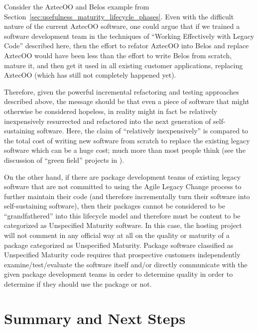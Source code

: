 \documentclass[11pt]{SANDreport}
\begin{document}
Consider the AztecOO and Belos example from
Section~\ref{sec:usefulness_maturity_lifecycle_phases}.  Even with the
difficult nature of the current AztecOO software, one could argue that
if we trained a software development team in the techniques of
``Working Effectively with Legacy Code'' described here, then the
effort to refator AztecOO into Belos and replace AztecOO would have
been less than the effort to write Belos from scratch, mature it, and
then get it used in all existing customer applications, replacing
AztecOO (which has still not completely happened yet).

Therefore, given the powerful incremental refactoring and testing
approaches described above, the message should be that even a piece of
software that might otherwise be considered hopeless, in reality might
in fact be relatively inexpensively resurrected and refactored into
the next generation of self-sustaining software.  Here, the claim of
``relatively inexpensively'' is compared to the total cost of writing
new software from scratch to replace the existing legacy software
which can be a huge cost; much more than most people think (see the
discussion of ``green field'' projects in
{}\cite{WorkingEffectivelyWithLegacyCode05}).

On the other hand, if there are package development teams of existing
legacy software that are not committed to using the Agile Legacy
Change process to further maintain their code (and therefore
incrementally turn their software into self-sustaining software), then
their packages cannot be considered to be ``grandfathered'' into this
lifecycle model and therefore must be content to be categorized as
Unspecified Maturity software.  In this case, the hosting project will
not comment in any official way at all on the quality or maturity of a
package categorized as Unspecified Maturity.  Package software
classified as Unspecified Maturity code requires that prospective
customers independently examine/test/evaluate the software itself
and/or directly communicate with the given package development teams
in order to determine quality in order to determine if they should use
the package or not.


%
{}\section{Summary and Next Steps}
\label{sec:summary_next_steps}
%
\end{document}
